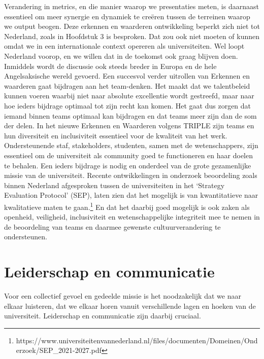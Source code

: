 \documentclass{jote-book}
\begin{document}
	Verandering in metrics, en die manier waarop we presentaties meten, is daarnaast essentieel om meer synergie en dynamiek te creëren tussen de terreinen waarop we output beogen. Deze erkennen en waarderen ontwikkeling beperkt zich niet tot Nederland, zoals in Hoofdstuk 3 is besproken. Dat zou ook niet moeten of kunnen omdat we in een internationale context opereren als universiteiten. Wel loopt Nederland voorop, en we willen dat in de toekomst ook graag blijven doen. Inmiddels wordt de discussie ook steeds breder in Europa en de hele Angelsaksische wereld gevoerd. Een succesvol verder uitrollen van Erkennen en waarderen gaat bijdragen aan het team-denken. Het maakt dat we talentbeleid kunnen voeren waarbij niet naar absolute excellentie wordt gestreefd, maar naar hoe ieders bijdrage optimaal tot zijn recht kan komen. Het gaat dus zorgen dat iemand binnen teams optimaal kan bijdragen en dat teams meer zijn dan de som der delen. In het nieuwe Erkennen en Waarderen volgens TRIPLE zijn teams en hun diversiteit en inclusiviteit essentieel voor de kwaliteit van het werk. Ondersteunende staf, stakeholders, studenten, samen met de wetenschappers, zijn essentieel om de universiteit als community goed te functioneren en haar doelen te behalen. Een ieders bijdrage is nodig en onderdeel van de grote gezamenlijke missie van de universiteit. Recente ontwikkelingen in onderzoek beoordeling zoals binnen Nederland afgesproken tussen de universiteiten in het ‘Strategy Evaluation Protocol' (SEP), laten zien dat het mogelijk is van kwantitatieve naar kwalitatieve maten te gaan.\footnote{https://www.universiteitenvannederland.nl/files/documenten/Domeinen/Onderzoek/SEP\_2021-2027.pdf} En dat het daarbij goed mogelijk is ook zaken als openheid, veiligheid, inclusiviteit en wetenschappelijke integriteit mee te nemen in de beoordeling van teams en daarmee gewenste cultuurverandering te ondersteunen.



	\section{Leiderschap en communicatie}



	Voor een collectief gevoel en gedeelde missie is het noodzakelijk dat we naar elkaar luisteren, dat we elkaar horen vanuit verschillende lagen en hoeken van de universiteit. Leiderschap en communicatie zijn daarbij cruciaal.
\end{document}
